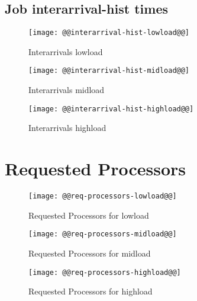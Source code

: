 \documentclass[11pt]{article}
\begin{document}
\newpage
\subsection{Job interarrival-hist times}
\begin{figure}[htbp]
  \begin{center}
    \texttt{[image: @@interarrival-hist-lowload@@]}
    \caption{Interarrivals lowload }
    \label{fig:interarrival-hist-lowload}
  \end{center}
\end{figure}
\begin{figure}[htbp]
  \begin{center}
    \texttt{[image: @@interarrival-hist-midload@@]}
    \caption{Interarrivals midload }
    \label{fig:interarrival-hist-midload}
  \end{center}
\end{figure}
\begin{figure}[htbp]
  \begin{center}
    \texttt{[image: @@interarrival-hist-highload@@]}
    \caption{Interarrivals highload }
    \label{fig:interarrival-hist-highload}
  \end{center}
\end{figure}


\newpage
\section{Requested Processors}
\begin{figure}[htbp]
  \begin{center}
    \texttt{[image: @@req-processors-lowload@@]}
    \caption{Requested Processors for lowload}
    \label{fig:req-processors-lowload}
  \end{center}
\end{figure}
\begin{figure}[htbp]
  \begin{center}
    \texttt{[image: @@req-processors-midload@@]}
    \caption{Requested Processors for midload}
    \label{fig:req-processors-midload}
  \end{center}
\end{figure}
\begin{figure}[htbp]
  \begin{center}
    \texttt{[image: @@req-processors-highload@@]}
    \caption{Requested Processors for highload}
    \label{fig:req-processors-highload}
  \end{center}
\end{figure}
\end{document}
